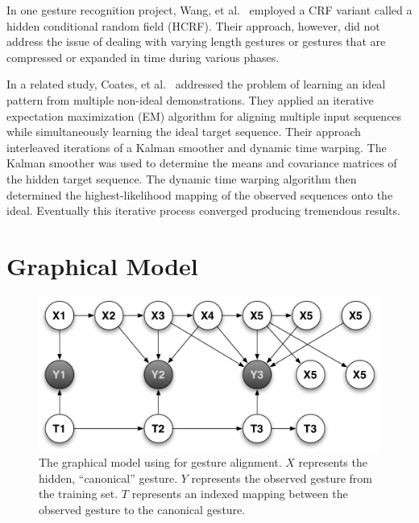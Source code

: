 \documentclass{article}
\begin{document}
In one gesture recognition project, Wang, et al.\ \cite{Wang2006} employed a
CRF variant called a hidden conditional random field (HCRF). Their approach,
however, did not address the issue of dealing with varying length gestures or
gestures that are compressed or expanded in time during various phases.

In a related study, Coates, et al.\ \cite{Coates2008} addressed the problem of
learning an ideal pattern from multiple non-ideal demonstrations. They applied
an iterative expectation maximization (EM) algorithm for aligning multiple input
sequences while simultaneously learning the ideal target sequence. Their
approach interleaved iterations of a Kalman smoother and dynamic time warping.
The Kalman smoother \cite{Muphy2002} was used to determine the means and
covariance matrices of the hidden target sequence. The dynamic time warping
algorithm \cite{Listgarten2005} then determined the highest-likelihood mapping
of the observed sequences onto the ideal. Eventually this iterative process
converged producing tremendous results.

\section{Graphical Model}


\begin{figure}
\begin{centering}
\includegraphics[width=0.65\columnwidth]{figures/model_tau_unobserved.pdf}

\caption{The graphical model using for gesture alignment. $X$ represents the
hidden, ``canonical'' gesture. $Y$ represents the observed gesture from the
training set. $T$ represents an indexed mapping between the observed gesture
to the canonical gesture.\label{figure:model_tau_unobserved}}

\end{centering}
\end{figure}
\end{document}
